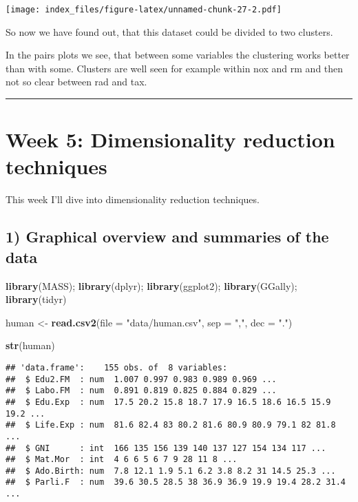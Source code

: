 \documentclass[]{article}
\newenvironment{Shaded}{\begin{snugshade}}{\end{snugshade}}
\newcommand{\KeywordTok}[1]{\textcolor[rgb]{0.13,0.29,0.53}{\textbf{#1}}}
\newcommand{\DataTypeTok}[1]{\textcolor[rgb]{0.13,0.29,0.53}{#1}}
\newcommand{\StringTok}[1]{\textcolor[rgb]{0.31,0.60,0.02}{#1}}
\newcommand{\NormalTok}[1]{#1}
\begin{document}
\texttt{[image: index\_files/figure-latex/unnamed-chunk-27-2.pdf]}

So now we have found out, that this dataset could be divided to two
clusters.

In the pairs plots we see, that between some variables the clustering
works better than with some. Clusters are well seen for example within
nox and rm and then not so clear between rad and tax.

\begin{center}\rule{0.5\linewidth}{\linethickness}\end{center}

\section{Week 5: Dimensionality reduction
techniques}\label{week-5-dimensionality-reduction-techniques}

This week I'll dive into dimensionality reduction techniques.

\subsection{1) Graphical overview and summaries of the
data}\label{graphical-overview-and-summaries-of-the-data}

\begin{Shaded}
\begin{Highlighting}[]
\KeywordTok{library}\NormalTok{(MASS); }\KeywordTok{library}\NormalTok{(dplyr); }\KeywordTok{library}\NormalTok{(ggplot2); }\KeywordTok{library}\NormalTok{(GGally); }\KeywordTok{library}\NormalTok{(tidyr)}

\NormalTok{human <-}\StringTok{ }\KeywordTok{read.csv2}\NormalTok{(}\DataTypeTok{file =} \StringTok{"data/human.csv"}\NormalTok{, }\DataTypeTok{sep =} \StringTok{","}\NormalTok{, }\DataTypeTok{dec =} \StringTok{"."}\NormalTok{)}

\KeywordTok{str}\NormalTok{(human)}
\end{Highlighting}
\end{Shaded}

\begin{verbatim}
## 'data.frame':    155 obs. of  8 variables:
##  $ Edu2.FM  : num  1.007 0.997 0.983 0.989 0.969 ...
##  $ Labo.FM  : num  0.891 0.819 0.825 0.884 0.829 ...
##  $ Edu.Exp  : num  17.5 20.2 15.8 18.7 17.9 16.5 18.6 16.5 15.9 19.2 ...
##  $ Life.Exp : num  81.6 82.4 83 80.2 81.6 80.9 80.9 79.1 82 81.8 ...
##  $ GNI      : int  166 135 156 139 140 137 127 154 134 117 ...
##  $ Mat.Mor  : int  4 6 6 5 6 7 9 28 11 8 ...
##  $ Ado.Birth: num  7.8 12.1 1.9 5.1 6.2 3.8 8.2 31 14.5 25.3 ...
##  $ Parli.F  : num  39.6 30.5 28.5 38 36.9 36.9 19.9 19.4 28.2 31.4 ...
\end{verbatim}
\end{document}
